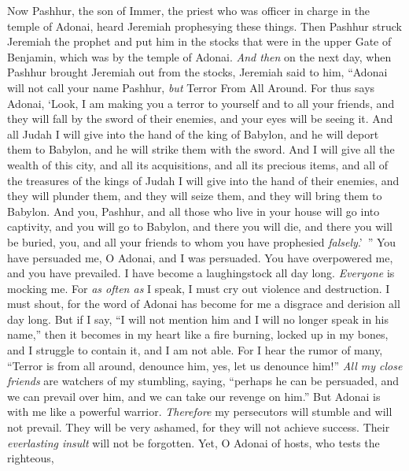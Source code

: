 \begin{biblechapter} %
 Now Pashhur, the son of Immer, the priest who was officer in charge in the temple of Adonai, heard Jeremiah prophesying these things.
\verse Then Pashhur struck Jeremiah the prophet and put him in the stocks that were in the upper Gate of Benjamin, which was by the temple of Adonai.
\verse \textit{And then} on the next day, when Pashhur brought Jeremiah out from the stocks, Jeremiah said to him, “Adonai will not call your name Pashhur, \textit{but} Terror From All Around.
\verse For thus says Adonai, ‘Look, I am making you a terror to yourself and to all your friends, and they will fall by the sword of their enemies, and your eyes will be seeing it. And all Judah I will give into the hand of the king of Babylon, and he will deport them to Babylon, and he will strike them with the sword.
\verse And I will give all the wealth of this city, and all its acquisitions, and all its precious items, and all of the treasures of the kings of Judah I will give into the hand of their enemies, and they will plunder them, and they will seize them, and they will bring them to Babylon.
\verse And you, Pashhur, and all those who live in your house will go into captivity, and you will go to Babylon, and there you will die, and there you will be buried, you, and all your friends to whom you have prophesied \textit{falsely}.’ ”
 You have persuaded me, O Adonai, and I was persuaded. 
You have overpowered me, and you have prevailed. 
I have become a laughingstock all day long. 
\textit{Everyone} is mocking me.
\verse For \textit{as often as} I speak, 
I must cry out violence and destruction. 
I must shout, for the word of Adonai has become for me 
a disgrace and derision all day long.
\verse But if I say, “I will not mention him 
and I will no longer speak in his name,” 
then it becomes in my heart like a fire burning, 
locked up in my bones, 
and I struggle to contain it, 
and I am not able.
\verse For I hear the rumor of many, 
“Terror is from all around, denounce him, 
yes, let us denounce him!” 
\textit{All my close friends} are watchers of my stumbling, 
saying, “perhaps he can be persuaded, 
and we can prevail over him, 
and we can take our revenge on him.”
\verse But Adonai is with me like a powerful warrior. 
\textit{Therefore} my persecutors will stumble and will not prevail. 
They will be very ashamed, for they will not achieve success. 
Their \textit{everlasting insult} will not be forgotten.
\verse Yet, O Adonai of hosts, who tests the righteous, 

\end{biblechapter}
